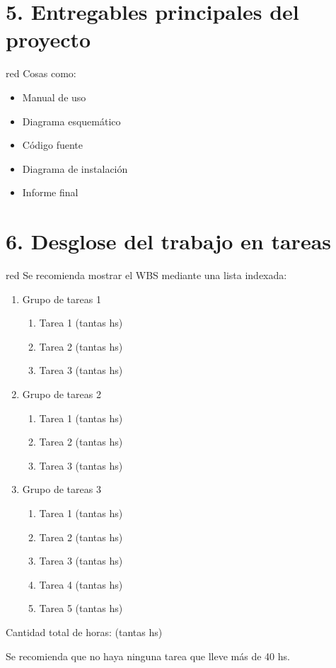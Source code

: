 \documentclass[11pt]{charter}
\begin{document}
\section{5. Entregables principales del proyecto}
\label{sec:entregables}

\begin{consigna}{red}
Cosas como: 
\begin{itemize}
\item Manual de uso
\item Diagrama esquemático
\item Código fuente
\item Diagrama de instalación
\item Informe final

\end{itemize}

\end{consigna}

\section{6. Desglose del trabajo en tareas}
\label{sec:wbs}

\begin{consigna}{red}
Se recomienda mostrar el WBS mediante una lista indexada:

\begin{enumerate}
\item Grupo de tareas 1
	\begin{enumerate}
	\item Tarea 1 (tantas hs)
	\item Tarea 2 (tantas hs)
	\item Tarea 3 (tantas hs)
	\end{enumerate}
\item Grupo de tareas 2
	\begin{enumerate}
	\item Tarea 1 (tantas hs)
	\item Tarea 2 (tantas hs)
	\item Tarea 3 (tantas hs)
	\end{enumerate}
	\item Grupo de tareas 3
	\begin{enumerate}
	\item Tarea 1 (tantas hs)
	\item Tarea 2 (tantas hs)
	\item Tarea 3 (tantas hs)
	\item Tarea 4 (tantas hs)
	\item Tarea 5 (tantas hs)
	\end{enumerate}
\end{enumerate}

Cantidad total de horas: (tantas hs)

Se recomienda que no haya ninguna tarea que lleve más de 40 hs. 

\end{consigna}
\end{document}
